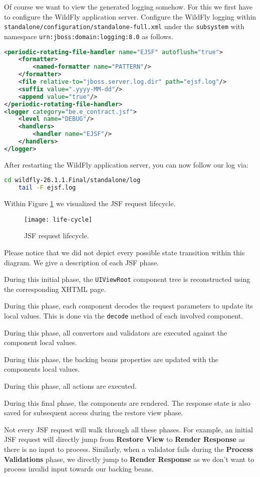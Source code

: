 Of course we want to view the generated logging somehow.
For this we first have to configure the WildFly application server.
Configure the WildFly logging within \texttt{standalone/configuration/standalone-full.xml} under the \texttt{subsystem} with namespace \texttt{urn:jboss:domain:logging:8.0} as follows.
\begin{lstlisting}[language=XML]
<periodic-rotating-file-handler name="EJSF" autoflush="true">
	<formatter>
		<named-formatter name="PATTERN"/>
	</formatter>
	<file relative-to="jboss.server.log.dir" path="ejsf.log"/>
	<suffix value=".yyyy-MM-dd"/>
	<append value="true"/>
</periodic-rotating-file-handler>
<logger category="be.e_contract.jsf">
	<level name="DEBUG"/>
	<handlers>
		<handler name="EJSF"/>
	</handlers>
</logger>
\end{lstlisting}
After restarting the WildFly application server, you can now follow our log via:
\begin{lstlisting}[language=bash]
	cd wildfly-26.1.1.Final/standalone/log
	tail -F ejsf.log
\end{lstlisting}
Within Figure \ref{fig:life-cycle} we visualized the JSF request lifecycle.
\begin{figure}[htbp]
	\begin{center}
		\texttt{[image: life-cycle]}
		\caption{JSF request lifecycle.}
		\label{fig:life-cycle}
	\end{center}
\end{figure}
Please notice that we did not depict every possible state transition within this diagram.
We give a description of each JSF phase.
\begin{description}[style=nextline]
	\item[Restore View]
	During this initial phase, the \texttt{UIViewRoot} component tree is reconstructed using the corresponding XHTML page.
	\item[Apply Request Values]
	During this phase, each component decodes the request parameters to update its local values.
	This is done via the \texttt{decode} method of each involved component.
	\item[Process Validations]
	During this phase, all convertors and validators are executed against the component local values.
	\item[Update Model Values]
	During this phase, the backing beans properties are updated with the components local values.
	\item[Invoke Application]
	During this phase, all actions are executed.
	\item[Render Response]
	During this final phase, the components are rendered.
	The response state is also saved for subsequent access during the restore view phase.
\end{description}
Not every JSF request will walk through all these phases. For example, an initial JSF request will directly jump from \textbf{Restore View} to \textbf{Render Response} as there is no input to process.
Similarly, when a validator fails during the \textbf{Process Validations} phase, we directly jump to \textbf{Render Response} as we don't want to process invalid input towards our backing beans.

